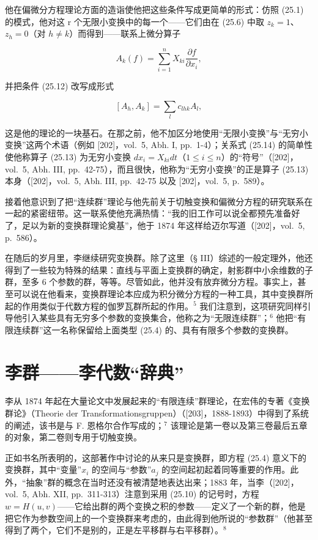 他在偏微分方程理论方面的造诣使他把这些条件写成更简单的形式：仿照 (25.1) 的模式，他对这 r 个无限小变换中的每一个——它们由在 (25.6) 中取 \(z_{k}=1\)、\(z_{h}=0\)（对 \(h\neq k\)）而得到——联系上微分算子

\[
A _ {k} (f) = \sum_ {i = 1} ^ {n} X _ {k i} \frac {\partial f}{\partial x _ {i}},\tag{25.13}
\]

并把条件 (25.12) 改写成形式

\[
[ A _ {h}, A _ {k} ] = \sum_ {l} c _ {l h k} A _ {l},\tag{25.14}
\]

这是他的理论的一块基石。在那之前，他不加区分地使用“无限小变换”与“无穷小变换”这两个术语（例如 {[}202{]}，vol.~5, Abh. I, pp.~1-4）；关系式 (25.14) 的简单性使他称算子 (25.13) 为无穷小变换 \(dx_{i} = X_{ki}dt\)（\(1 \leq i \leq n\)）的“符号”（{[}202{]}，vol.~5, Abh. III, pp.~42-75），而且很快，他称为“无穷小变换”的正是算子 (25.13) 本身（{[}202{]}，vol.~5, Abh. III, pp.~42-75 以及 {[}202{]}，vol.~5, p.~589）。

接着他意识到了把“连续群”理论与他先前关于切触变换和偏微分方程的研究联系在一起的紧密纽带。这一联系使他充满热情：“我的旧工作可以说全都预先准备好了，足以为新的变换群理论奠基”，他于 1874 年这样给迈尔写道（{[}202{]}，vol.~5, p.~586）。

在随后的岁月里，李继续研究变换群。除了这里（§ III）综述的一般定理外，他还得到了一些较为特殊的结果：直线与平面上变换群的确定，射影群中小余维数的子群，至多 6 个参数的群，等等。尽管如此，他并没有放弃微分方程。事实上，甚至可以说在他看来，变换群理论本应成为积分微分方程的一种工具，其中变换群所起的作用类似于代数方程的伽罗瓦群所起的作用。\(^{5}\) 我们注意到，这项研究同样引导他引入某些具有无穷多个参数的变换集合，他称之为“无限连续群”；\(^{6}\) 他把“有限连续群”这一名称保留给上面类型 (25.4) 的、具有有限多个参数的变换群。

\section{李群——李代数“辞典”}

李从 1874 年起在大量论文中发展起来的“有限连续”群理论，在宏伟的专著《变换群论》（Theorie der Transformationsgruppen）（{[}203{]}，1888-1893）中得到了系统的阐述，该书是与 F. 恩格尔合作写成的；\(^{7}\) 该理论是第一卷以及第三卷最后五章的对象，第二卷则专用于切触变换。

正如书名所表明的，这部著作中讨论的从来只是变换群，即方程 (25.4) 意义下的变换群，其中“变量”\(x_{i}\) 的空间与“参数”\(a_{j}\) 的空间起初起着同等重要的作用。此外，“抽象”群的概念在当时还没有被清楚地表达出来；1883 年，当李（{[}202{]}，vol.~5, Abh. XII, pp.~311-313）注意到采用 (25.10) 的记号时，方程 \(w = H(u, v)\)——它给出群的两个变换之积的参数——定义了一个新的群，他是把它作为参数空间上的一个变换群来考虑的，由此得到他所说的“参数群”（他甚至得到了两个，它们不是别的，正是左平移群与右平移群）。\(^{8}\)

